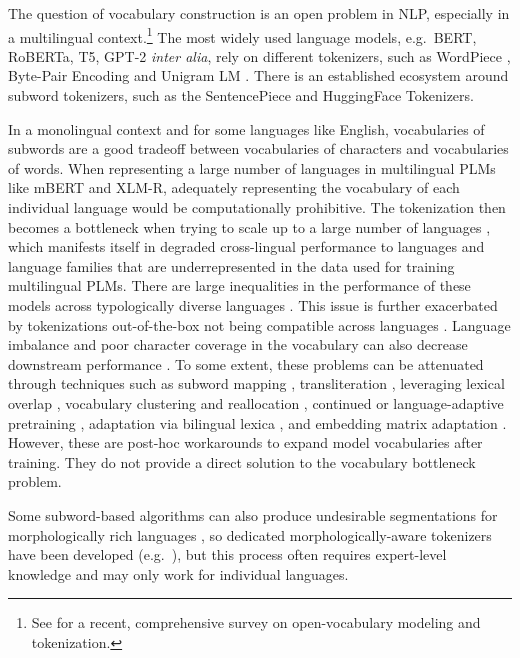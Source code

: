 \documentclass{article}
\begin{document}
The question of vocabulary construction is an open problem in NLP, especially in a multilingual context.\footnote{See \citet{DBLP:journals/corr/abs-2112-10508} for a recent, comprehensive survey on open-vocabulary modeling and tokenization.}
The most widely used language models, e.g.\ BERT, RoBERTa, T5, GPT-2 \textit{inter alia}, rely on different tokenizers, such as WordPiece \citep{devlin-etal-2019-bert}, Byte-Pair Encoding \citep[BPE; ][]{sennrich-etal-2016-neural} and Unigram LM \citep{kudo-2018-subword}. There is an established ecosystem around subword tokenizers, such as the SentencePiece \citep{kudo-richardson-2018-sentencepiece} and HuggingFace Tokenizers.

In a monolingual context and for some languages like English, vocabularies of subwords are a good tradeoff between vocabularies of characters and vocabularies of words.
When representing a large number of languages in multilingual PLMs like mBERT and XLM-R, adequately representing the vocabulary of each individual language would be computationally prohibitive. 
The tokenization then becomes a bottleneck when trying to scale up to a large number of languages \citep{conneau-etal-2020-unsupervised, rust-etal-2021-good}, which manifests itself in degraded cross-lingual performance to languages and language families that are underrepresented in the data used for training multilingual PLMs. There are large inequalities in the performance of these models across typologically diverse languages \citep{wu-dredze-2020-languages, lauscher-etal-2020-zero}. 
This issue is further exacerbated by tokenizations out-of-the-box not being compatible across languages \citep{maronikolakis-etal-2021-wine-v}. Language imbalance and poor character coverage in the vocabulary can also decrease downstream performance \citep{zhang2022robust}.
To some extent, these problems can be attenuated through techniques such as subword mapping \citep{vernikos-popescu-belis-2021-subword-mapping}, transliteration \citep{DBLP:journals/corr/abs-2201-12501}, leveraging lexical overlap \citep{patil-etal-2022-overlap}, vocabulary clustering and reallocation \citep{chung-etal-2020-improving}, continued or language-adaptive pretraining \citep{ebrahimi-kann-2021-adapt}, adaptation via bilingual lexica \citep{wang-etal-2022-expanding}, and embedding matrix adaptation \citep{artetxe-etal-2020-cross}. However, these are post-hoc workarounds to expand model vocabularies after training. They do not provide a direct solution to the vocabulary bottleneck problem.

Some subword-based algorithms can also produce undesirable segmentations for morphologically rich languages \citep{klein-tsarfaty-2020-getting, amrhein-sennrich-2021-suitable-subword}, so dedicated morphologically-aware tokenizers have been developed (e.g.\ \citet{smit-etal-2014-morfessor}), but this process often requires expert-level knowledge and may only work for individual languages.
\end{document}
